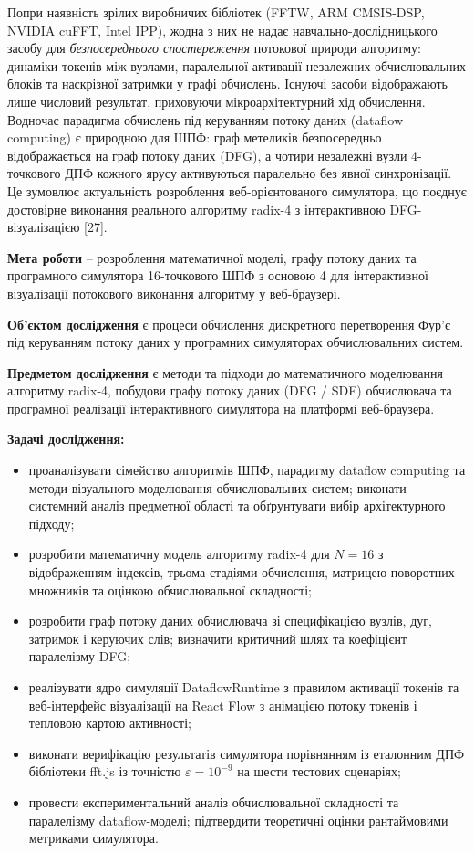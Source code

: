\documentclass[
]{article}
\begin{document}
Попри наявність зрілих виробничих бібліотек (FFTW, ARM CMSIS-DSP, NVIDIA
cuFFT, Intel IPP), жодна з них не надає навчально-дослідницького засобу
для \emph{безпосереднього спостереження} потокової природи алгоритму:
динаміки токенів між вузлами, паралельної активації незалежних
обчислювальних блоків та наскрізної затримки у графі обчислень. Існуючі
засоби відображають лише числовий результат, приховуючи
мікроархітектурний хід обчислення. Водночас парадигма обчислень під
керуванням потоку даних (dataflow computing) є природною для ШПФ: граф
метеликів безпосередньо відображається на граф потоку даних (DFG), а
чотири незалежні вузли 4-точкового ДПФ кожного ярусу активуються
паралельно без явної синхронізації. Це зумовлює актуальність розроблення
веб-орієнтованого симулятора, що поєднує достовірне виконання реального
алгоритму radix-4 з інтерактивною DFG-візуалізацією {[}27{]}.

\textbf{Мета роботи} -- розроблення математичної моделі, графу потоку
даних та програмного симулятора 16-точкового ШПФ з основою 4 для
інтерактивної візуалізації потокового виконання алгоритму у
веб-браузері.

\textbf{Об'єктом дослідження} є процеси обчислення дискретного
перетворення Фур'є під керуванням потоку даних у програмних симуляторах
обчислювальних систем.

\textbf{Предметом дослідження} є методи та підходи до математичного
моделювання алгоритму radix-4, побудови графу потоку даних (DFG / SDF)
обчислювача та програмної реалізації інтерактивного симулятора на
платформі веб-браузера.

\textbf{Задачі дослідження:}

\begin{itemize}
\item
  проаналізувати сімейство алгоритмів ШПФ, парадигму dataflow computing
  та методи візуального моделювання обчислювальних систем; виконати
  системний аналіз предметної області та обґрунтувати вибір
  архітектурного підходу;
\item
  розробити математичну модель алгоритму radix-4 для \(N = 16\) з
  відображенням індексів, трьома стадіями обчислення, матрицею
  поворотних множників та оцінкою обчислювальної складності;
\item
  розробити граф потоку даних обчислювача зі специфікацією вузлів, дуг,
  затримок і керуючих слів; визначити критичний шлях та коефіцієнт
  паралелізму DFG;
\item
  реалізувати ядро симуляції DataflowRuntime з правилом активації
  токенів та веб-інтерфейс візуалізації на React Flow з анімацією потоку
  токенів і тепловою картою активності;
\item
  виконати верифікацію результатів симулятора порівнянням із еталонним
  ДПФ бібліотеки fft.js із точністю \(\varepsilon = 10^{- 9}\) на шести
  тестових сценаріях;
\item
  провести експериментальний аналіз обчислювальної складності та
  паралелізму dataflow-моделі; підтвердити теоретичні оцінки
  рантаймовими метриками симулятора.
\end{itemize}
\end{document}
